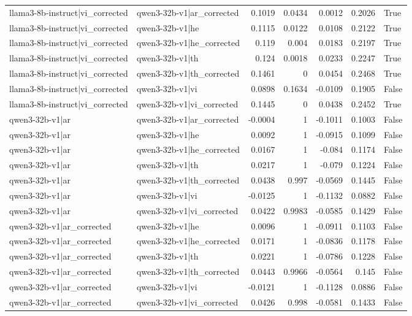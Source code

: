 \begin{table}
\begin{tabular}{l l r r r r l}
llama3-8b-instruct|vi_corrected & qwen3-32b-v1|ar_corrected & 0.1019 & 0.0434 & 0.0012 & 0.2026 & True \\
llama3-8b-instruct|vi_corrected & qwen3-32b-v1|he & 0.1115 & 0.0122 & 0.0108 & 0.2122 & True \\
llama3-8b-instruct|vi_corrected & qwen3-32b-v1|he_corrected & 0.119 & 0.004 & 0.0183 & 0.2197 & True \\
llama3-8b-instruct|vi_corrected & qwen3-32b-v1|th & 0.124 & 0.0018 & 0.0233 & 0.2247 & True \\
llama3-8b-instruct|vi_corrected & qwen3-32b-v1|th_corrected & 0.1461 & 0 & 0.0454 & 0.2468 & True \\
llama3-8b-instruct|vi_corrected & qwen3-32b-v1|vi & 0.0898 & 0.1634 & -0.0109 & 0.1905 & False \\
llama3-8b-instruct|vi_corrected & qwen3-32b-v1|vi_corrected & 0.1445 & 0 & 0.0438 & 0.2452 & True \\
qwen3-32b-v1|ar & qwen3-32b-v1|ar_corrected & -0.0004 & 1 & -0.1011 & 0.1003 & False \\
qwen3-32b-v1|ar & qwen3-32b-v1|he & 0.0092 & 1 & -0.0915 & 0.1099 & False \\
qwen3-32b-v1|ar & qwen3-32b-v1|he_corrected & 0.0167 & 1 & -0.084 & 0.1174 & False \\
qwen3-32b-v1|ar & qwen3-32b-v1|th & 0.0217 & 1 & -0.079 & 0.1224 & False \\
qwen3-32b-v1|ar & qwen3-32b-v1|th_corrected & 0.0438 & 0.997 & -0.0569 & 0.1445 & False \\
qwen3-32b-v1|ar & qwen3-32b-v1|vi & -0.0125 & 1 & -0.1132 & 0.0882 & False \\
qwen3-32b-v1|ar & qwen3-32b-v1|vi_corrected & 0.0422 & 0.9983 & -0.0585 & 0.1429 & False \\
qwen3-32b-v1|ar_corrected & qwen3-32b-v1|he & 0.0096 & 1 & -0.0911 & 0.1103 & False \\
qwen3-32b-v1|ar_corrected & qwen3-32b-v1|he_corrected & 0.0171 & 1 & -0.0836 & 0.1178 & False \\
qwen3-32b-v1|ar_corrected & qwen3-32b-v1|th & 0.0221 & 1 & -0.0786 & 0.1228 & False \\
qwen3-32b-v1|ar_corrected & qwen3-32b-v1|th_corrected & 0.0443 & 0.9966 & -0.0564 & 0.145 & False \\
qwen3-32b-v1|ar_corrected & qwen3-32b-v1|vi & -0.0121 & 1 & -0.1128 & 0.0886 & False \\
qwen3-32b-v1|ar_corrected & qwen3-32b-v1|vi_corrected & 0.0426 & 0.998 & -0.0581 & 0.1433 & False \\

\end{tabular}
\end{table}
